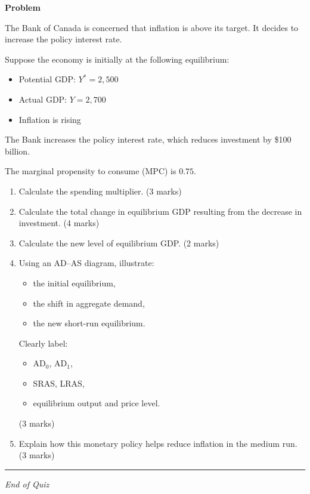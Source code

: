 \documentclass[12pt]{article}
\begin{document}
\textbf{Problem}

The Bank of Canada is concerned that inflation is above its target. It decides to increase the policy interest rate.

Suppose the economy is initially at the following equilibrium:
\begin{itemize}
    \item Potential GDP: \(Y^* = 2{,}500\)
    \item Actual GDP: \(Y = 2{,}700\)
    \item Inflation is rising
\end{itemize}

The Bank increases the policy interest rate, which reduces investment by \$100 billion.

The marginal propensity to consume (MPC) is \(0.75\).

\begin{enumerate}

\item[(a)] Calculate the spending multiplier. (3 marks)

\item[(b)] Calculate the total change in equilibrium GDP resulting from the decrease in investment. (4 marks)

\item[(c)] Calculate the new level of equilibrium GDP. (2 marks)

\item[(d)] Using an AD--AS diagram, illustrate:
\begin{itemize}
    \item the initial equilibrium,
    \item the shift in aggregate demand,
    \item the new short-run equilibrium.
\end{itemize}
Clearly label:
\begin{itemize}
    \item AD$_0$, AD$_1$,
    \item SRAS, LRAS,
    \item equilibrium output and price level.
\end{itemize}
(3 marks)

\item[(e)] Explain how this monetary policy helps reduce inflation in the medium run. (3 marks)

\end{enumerate}

\hrule
\vspace{1em}

\begin{center}
\textit{End of Quiz}
\end{center}
\end{document}
